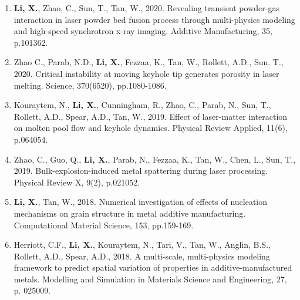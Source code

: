 \documentclass[11pt, letterpaper]{article}
\begin{document}
\begin{enumerate}[leftmargin=*, labelsep=4mm]
   \item \textbf{Li, X.}, Zhao, C., Sun, T., Tan, W., 2020. Revealing transient powder-gas
      interaction in laser powder bed fusion process through multi-physics modeling and high-speed
      synchrotron x-ray imaging. Additive Manufacturing, 35, p.101362. 

   \item Zhao C., Parab, N.D., \textbf{Li, X.}, Fezzaa, K., Tan, W., Rollett, A.D., Sun. T., 2020.
      Critical instability at moving keyhole tip generates porosity in laser melting. Science,
      370(6520), pp.1080-1086.

   \item Kouraytem, N., \textbf{Li, X.}, Cunningham, R., Zhao, C., Parab, N., Sun, T., Rollett,
      A.D., Spear, A.D., Tan, W., 2019. Effect of laser-matter interaction on molten pool flow and
      keyhole dynamics. Physical Review Applied, 11(6), p.064054.

   \item Zhao, C., Guo, Q., \textbf{Li, X.}, Parab, N., Fezzaa, K., Tan, W., Chen, L., Sun, T.,
      2019. Bulk-explosion-induced metal spattering during laser processing. Physical Review X,
      9(2), p.021052.

   \item \textbf{Li, X.}, Tan, W., 2018. Numerical investigation of effects of nucleation mechanisms
      on grain structure in metal additive manufacturing. Computational Material Science, 153,
      pp.159-169.

   \item Herriott, C.F., \textbf{Li, X.}, Kouraytem, N., Tari, V., Tan, W., Anglin, B.S., Rollett, A.D.,
      Spear, A.D., 2018. A multi-scale, multi-physics modeling framework to predict spatial
      variation of properties in additive-manufactured metals. Modelling and Simulation in
      Materials Science and Engineering, 27, p. 025009.
\end{enumerate}
\end{document}
